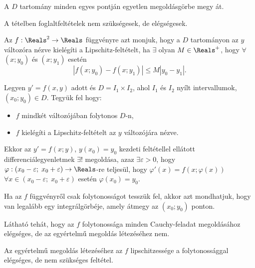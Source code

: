 \begin{note}
  A $D$ tartomány minden egyes pontján egyetlen megoldásgörbe megy át.

  A tételben foglaltfeltételek nem szükségesek, de elégségesek.
\end{note}

\begin{definition}
  Az $f : \Reals^2 \rightarrow \Reals$ függvényre azt monjuk,
  hogy  a $D$ tartományon az $y$ változóra nézve kielégíti a
  Lipschitz-feltételt, ha $\exists$ olyan $M \in \Reals^+$, hogy
  $\forall$ $\left( x; y_0 \right)$ és $\left( x; y_1 \right)$ esetén
  $$
    \left| f(x; y_0) - f(x; y_1) \right| \leq M \left| y_0 - y_1 \right|.
  $$
\end{definition}

\begin{theorem}
  Legyen $y' = f(x, y)$ adott és $D = I_1 \times I_2$, ahol $I_1$ és $I_2$ nyílt
  intervallumok, $\left( x_0 ; y_0 \right) \in D$. Tegyük fel hogy:
  \begin{itemize}
    \item $f$ mindkét változójában folytonos $D$-n,
    \item $f$ kielégíti a Lipschitz-feltételt az $y$
          változójára nézve.
  \end{itemize}
  Ekkor az $y' = f(x; y)$, $y(x_0) = y_0$ kezdeti feltétellel
  ellátott differenciálegyenletmek $\exists!$ megoldása, azaz
  $\exists \varepsilon > 0$, hogy $\varphi :
    \left( x_0 - \varepsilon; \; x_0 + \varepsilon \right)
    \rightarrow \Reals$-re teljesül, hogy $\varphi' (x)
    = f \left(x ; \varphi(x)\right)$
  $\forall x \in \left( x_0 - \varepsilon; \; x_0 + \varepsilon \right)$
  esetén $\varphi(x_0) = y_0$.
\end{theorem}

\begin{theorem}
  Ha az $f$ függvényről csak folytonosságot tesszük fel, akkor azt mondhatjuk,
  hogy van legalább egy integrálgörbéje, amely átmegy az
  $\left( x_0 ; y_0 \right)$ ponton.
\end{theorem}

\begin{note}
  Látható tehát, hogy az $f$ folytonossága minden Cauchy-feladat megoldásához
  elégséges, de az egyértelmű megoldás létezéséhez nem.

  Az egyértelmű megoldás létezéséhez az $f$ lipschitzessége a folytonossággal
  elégséges, de nem szükséges feltétel.
\end{note}

